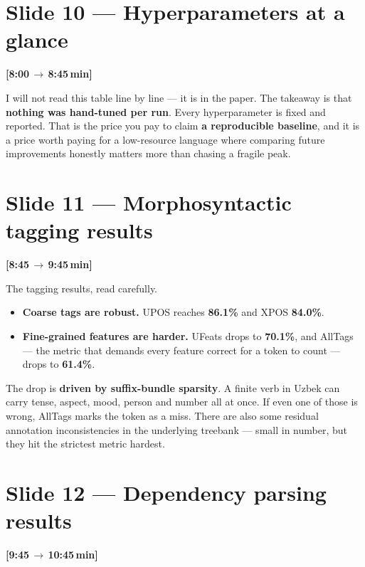 \documentclass[12pt,a4paper]{article}
\newcommand{\timing}[2]{%
   \par\noindent\textbf{\small [#1\,$\to$\,#2\,min]}\par\vspace{0.2em}}
\newcommand{\say}[1]{\textbf{#1}}
\begin{document}
\section*{Slide 10 --- Hyperparameters at a glance}
\timing{8:00}{8:45}

I will not read this table line by line --- it is in the paper. The
takeaway is that \textbf{nothing was hand-tuned per run}. Every
hyperparameter is fixed and reported. That is the price you pay to
claim \say{a reproducible baseline}, and it is a price worth paying for
a low-resource language where comparing future improvements honestly
matters more than chasing a fragile peak.

\section*{Slide 11 --- Morphosyntactic tagging results}
\timing{8:45}{9:45}

The tagging results, read carefully.

\begin{itemize}
   \item \textbf{Coarse tags are robust.} UPOS reaches \textbf{86.1\%} and XPOS \textbf{84.0\%}.
   \item \textbf{Fine-grained features are harder.} UFeats drops to \textbf{70.1\%}, and AllTags --- the metric that demands every feature correct for a token to count --- drops to \textbf{61.4\%}.
\end{itemize}

\noindent
The drop is \say{driven by suffix-bundle sparsity}. A finite verb in
Uzbek can carry tense, aspect, mood, person and number all at once. If
even one of those is wrong, AllTags marks the token as a miss. There
are also some residual annotation inconsistencies in the underlying
treebank --- small in number, but they hit the strictest metric hardest.

\section*{Slide 12 --- Dependency parsing results}
\timing{9:45}{10:45}
\end{document}
